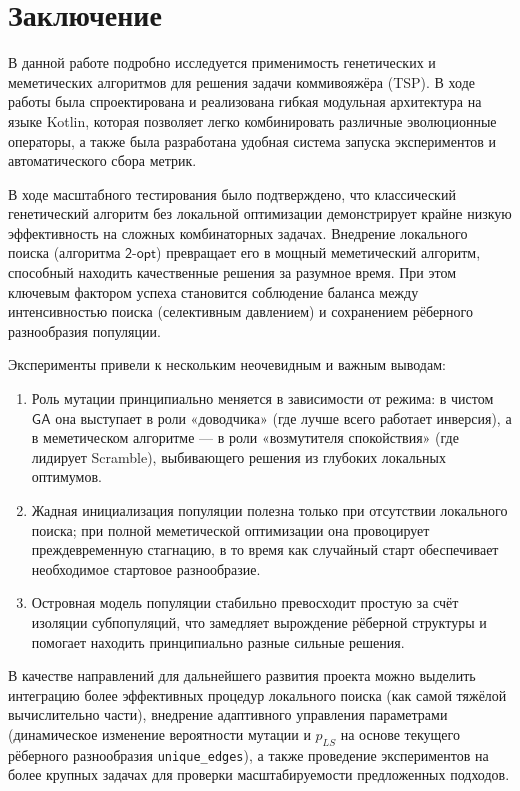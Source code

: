 \documentclass[a4paper,12pt]{article}
\begin{document}
\section{Заключение}

В данной работе подробно исследуется применимость генетических и меметических алгоритмов для решения задачи коммивояжёра (TSP). В ходе работы была спроектирована и реализована гибкая модульная архитектура на языке Kotlin, которая позволяет легко комбинировать различные эволюционные операторы, а также была разработана удобная система запуска экспериментов и автоматического сбора метрик.

В ходе масштабного тестирования было подтверждено, что классический генетический алгоритм без локальной оптимизации демонстрирует крайне низкую эффективность на сложных комбинаторных задачах. Внедрение локального поиска (алгоритма $\mathsf{2\mbox{-}opt}$) превращает его в мощный меметический алгоритм, способный находить качественные решения за разумное время. При этом ключевым фактором успеха становится соблюдение баланса между интенсивностью поиска (селективным давлением) и сохранением рёберного разнообразия популяции.

Эксперименты привели к нескольким неочевидным и важным выводам:
\begin{enumerate}
    \item Роль мутации принципиально меняется в зависимости от режима: в чистом $\mathsf{GA}$ она выступает в роли «доводчика» (где лучше всего работает инверсия), а в меметическом алгоритме — в роли «возмутителя спокойствия» (где лидирует Scramble), выбивающего решения из глубоких локальных оптимумов.
    \item Жадная инициализация популяции полезна только при отсутствии локального поиска; при полной меметической оптимизации она провоцирует преждевременную стагнацию, в то время как случайный старт обеспечивает необходимое стартовое разнообразие.
    \item Островная модель популяции стабильно превосходит простую за счёт изоляции субпопуляций, что замедляет вырождение рёберной структуры и помогает находить принципиально разные сильные решения.
\end{enumerate}

В качестве направлений для дальнейшего развития проекта можно выделить интеграцию более эффективных процедур локального поиска (как самой тяжёлой вычислительно части), внедрение адаптивного управления параметрами (динамическое изменение вероятности мутации и $p_{LS}$ на основе текущего рёберного разнообразия \texttt{unique\_edges}), а также проведение экспериментов на более крупных задачах для проверки масштабируемости предложенных подходов.


 
\end{document}
